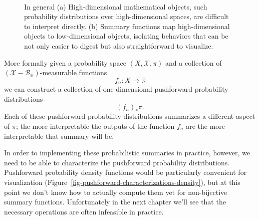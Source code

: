 \documentclass[
  letterpaper,
  DIV=11,
  numbers=noendperiod]{scrartcl}
\begin{document}
\begin{figure}
\begin{minipage}[t]{0.90\linewidth}
{\centering 


}

\subcaption{\label{fig-informative-perspectives}}
\end{minipage}%
%
\begin{minipage}[t]{0.05\linewidth}

{\centering 

~

}

\end{minipage}%

\caption{\label{fig-projective-viewing}In general (a) High-dimensional
mathematical objects, such probability distributions over
high-dimensional spaces, are difficult to interpret directly. (b)
Summary functions map high-dimensional objects to low-dimensional
objects, isolating behaviors that can be not only easier to digest but
also straightforward to visualize.}

\end{figure}

More formally given a probability space \((X, \mathcal{X}, \pi)\) and a
collection of \((\mathcal{X}-\mathcal{B}_{\mathbb{R}})\)-measurable
functions \[
f_{n} : X \rightarrow \mathbb{R}
\] we can construct a collection of one-dimensional pushforward
probability distributions \[
(f_{n})_{*} \pi.
\] Each of these pushforward probability distributions summarizes a
different aspect of \(\pi\); the more interpretable the outputs of the
function \(f_{n}\) are the more interpretable that summary will be.

In order to implementing these probabilistic summaries in practice,
however, we need to be able to characterize the pushforward probability
distributions. Pushforward probability density functions would be
particularly convenient for visualization
(Figure~\ref{fig-pushforward-characterizations-density}), but at this
point we don't know how to actually compute them yet for non-bijective
summary functions. Unfortunately in the next chapter we'll see that the
necessary operations are often infeasible in practice.
\end{document}
